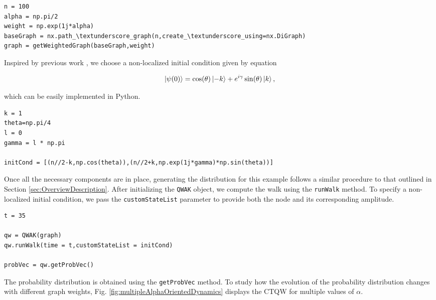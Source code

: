 \documentclass[main.tex]{subfiles}
\begin{document}
\begin{lstlisting}[style=code,escapeinside={__}]
n = 100
alpha = np.pi/2
weight = np.exp(1j*alpha)
baseGraph = nx.path_\textunderscore_graph(n,create_\textunderscore_using=nx.DiGraph)
graph = getWeightedGraph(baseGraph,weight)
\end{lstlisting}

Inspired by previous work \cite{abalEffects06}, we choose a non-localized
initial condition given by equation

\begin{equation}
    \label{eq:survProbInitCond}
    \ket{\psi(0)} = \cos(\theta)\ket{-k} + e^{i\gamma}\sin(\theta)\ket{k},
\end{equation}


which can be easily implemented in Python. 

\begin{lstlisting}[style=code,escapeinside={__}]
k = 1
theta=np.pi/4
l = 0
gamma = l * np.pi

initCond = [(n//2-k,np.cos(theta)),(n//2+k,np.exp(1j*gamma)*np.sin(theta))]
\end{lstlisting}

Once all the necessary components are in place, generating the distribution for
this example follows a similar procedure to that outlined in Section
\ref{sec:OverviewDescription}. After initializing the \texttt{QWAK} object, we
compute the  walk using the \texttt{runWalk} method. To specify a
non-localized initial condition, we pass the \texttt{customStateList} parameter
to provide both the node and its corresponding amplitude.

\begin{lstlisting}[style=code,escapeinside={__}]
t = 35

qw = QWAK(graph)
qw.runWalk(time = t,customStateList = initCond)

probVec = qw.getProbVec()
\end{lstlisting}

The probability distribution is obtained using the \texttt{getProbVec} method. To
study how the evolution of the probability distribution changes with different
graph weights, Fig. \ref{fig:multipleAlphaOrientedDynamics} displays the CTQW
for multiple values of $\alpha$.
\end{document}
